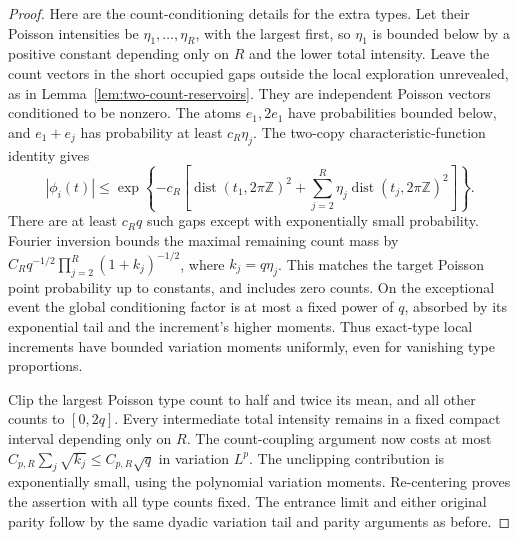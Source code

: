\documentclass[11pt,letterpaper]{article}
\begin{document}
\begin{proof}
Here are the count-conditioning details for the extra types.
Let their Poisson intensities be $\eta_1,\ldots,\eta_R$,
with the largest first, so $\eta_1$ is bounded below by a
positive constant depending only on $R$ and the lower total
intensity. Leave the count vectors in the short occupied
gaps outside the local exploration unrevealed, as in
Lemma~\ref{lem:two-count-reservoirs}.
They are independent Poisson vectors conditioned to be nonzero.
The atoms $e_1,2e_1$ have probabilities bounded below,
and $e_1+e_j$ has probability at least $c_R\eta_j$.
The two-copy characteristic-function identity gives
\[
 |\phi_i(t)|\le
 \exp\left\{-c_R\left[
   \operatorname{dist}(t_1,2\pi\mathbb Z)^2+
   \sum_{j=2}^R\eta_j\operatorname{dist}(t_j,2\pi\mathbb Z)^2
                         \right]\right\}.
 \]
There are at least $c_Rq$ such gaps except with exponentially
small probability. Fourier inversion bounds the maximal
remaining count mass by
$C_Rq^{-1/2}\prod_{j=2}^R(1+k_j)^{-1/2}$, where
$k_j=q\eta_j$. This matches the target Poisson point
probability up to constants, and includes zero counts.
On the exceptional event the global conditioning factor
is at most a fixed power of $q$, absorbed by its exponential
tail and the increment's higher moments.
Thus exact-type local increments have bounded variation
moments uniformly, even for vanishing type proportions.

Clip the largest Poisson type count to half and twice its
mean, and all other counts to $[0,2q]$.
Every intermediate total intensity remains in a fixed compact
interval depending only on $R$.
The count-coupling argument now costs at most
$C_{p,R}\sum_j\sqrt{k_j}\le C_{p,R}\sqrt q$ in variation
$L^p$. The unclipping contribution is exponentially small,
using the polynomial variation moments.
Re-centering proves the assertion with all type counts fixed.
The entrance limit and either original parity follow by the
same dyadic variation tail and parity arguments as before.
\end{proof}
\end{document}

